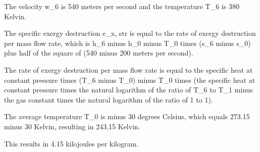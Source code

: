 The velocity w_6 is 540 meters per second and the temperature T_6 is 380 Kelvin.

The specific exergy destruction e_{x, str} is equal to the rate of exergy destruction per mass flow rate, which is h_6 minus h_0 minus T_0 times (s_6 minus s_0) plus half of the square of (540 minus 200 meters per second).

The rate of exergy destruction per mass flow rate is equal to the specific heat at constant pressure times (T_6 minus T_0) minus T_0 times (the specific heat at constant pressure times the natural logarithm of the ratio of T_6 to T_1 minus the gas constant times the natural logarithm of the ratio of 1 to 1).

The average temperature T_0 is minus 30 degrees Celsius, which equals 273.15 minus 30 Kelvin, resulting in 243.15 Kelvin.

This results in 4.15 kilojoules per kilogram.